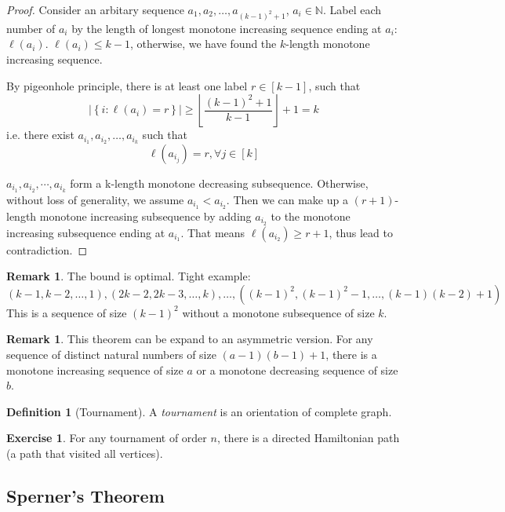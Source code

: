 \documentclass{article}
\theoremstyle{definition}
\newtheorem{remark}[theorem]{Remark}
\newtheorem{definition}[theorem]{Definition}
\newtheorem{exercise}[theorem]{Exercise}
\begin{document}
\begin{proof}
  Consider an arbitary sequence $a_1,a_2,\ldots,a_{(k-1)^2+1}$, $a_i\in \mathbb{N}$.
  Label each number of $a_i$ by the length of longest monotone increasing sequence ending at $a_i$: $\ell(a_i)$. $\ell(a_i)\le k-1$, otherwise, we have found the $k$-length monotone increasing sequence.
  
  By pigeonhole principle, there is at least one label $r\in[k-1]$, such that $$\left | \left \{i: \ell (a_i)=r \right \}  \right | \ge \left \lfloor \frac{(k-1)^2+1}{k-1}  \right \rfloor +1=k$$
  i.e. there exist $a_{i_1},a_{i_2},\ldots,a_{i_k}$
        such that $$\ell (a_{i_j})=r,\forall j\in [k] $$
  
  $a_{i_1},a_{i_2},\cdots,a_{i_k}$ form a k-length monotone decreasing subsequence. Otherwise, without loss of generality, we assume $a_{i_1}<a_{i_2}$. Then we can make up a $(r+1)$-length monotone increasing subsequence by adding $a_{i_2}$ to the monotone increasing subsequence ending at $a_{i_1}$. That means $\ell (a_{i_2}) \ge r+1$, thus lead to contradiction.
\end{proof}

\begin{remark}
    The bound is optimal. Tight example: $$(k-1,k-2,\ldots,1), (2k-2, 2k-3,\ldots,k),\ldots,((k-1)^2,(k-1)^2-1,\ldots,(k-1)(k-2)+1)$$
    This is a sequence of size $(k-1)^2$ without a monotone  subsequence of size $k$.
\end{remark}

\begin{remark}
    This theorem can be expand to an asymmetric version.
    For any sequence of distinct natural numbers of size $(a-1)(b-1)+1$, there is a monotone increasing sequence of size $a$ or a monotone decreasing sequence of size $b$.
\end{remark}

\begin{definition}[Tournament]
  A \emph{tournament} is an orientation of complete graph.
\end{definition}

\begin{exercise}
    For any tournament of order $n$, there is a directed Hamiltonian path (a path that visited all vertices).
\end{exercise}

\subsection{Sperner's Theorem}
\end{document}
